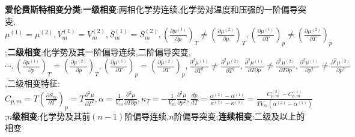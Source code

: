 \documentclass[10pt,a4paper]{article}
\begin{document}
\begin{multicols}{2}
\textbf{爱伦费斯特相变分类}:\textbf{一级相变}:两相化学势连续,化学势对温度和压强的一阶偏导突变,$\mu^{(1)}=\mu^{(2)},V_m^{(1)}=V_m^{(2)},S_m^{(1)}=S_m^{(2)},\left(\frac{\partial\mu^{(1)}}{\partial p}\right)_T\neq\left(\frac{\partial\mu^{(2)}}{\partial p}\right)_T,\left(\frac{\partial\mu^{(1)}}{\partial T}\right)_p\neq\left(\frac{\partial\mu^{(2)}}{\partial T}\right)_p$;\textbf{二级相变}:化学势及其一阶偏导连续,二阶偏导突变,$\cdots,\left(\frac{\partial\mu^{(1)}}{\partial p}\right)_T=\left(\frac{\partial\mu^{(2)}}{\partial p}\right)_T,\left(\frac{\partial\mu^{(1)}}{\partial T}\right)_p=\left(\frac{\partial\mu^{(2)}}{\partial T}\right)_p,\frac{\partial^2\mu^{(1)}}{\partial T^2}\neq\frac{\partial^2\mu^{(2)}}{\partial T^2},\frac{\partial^2\mu^{(1)}}{\partial T\partial p}\neq\frac{\partial^2\mu^{(2)}}{\partial T\partial p},\frac{\partial^2\mu^{(1)}}{\partial p^2}\neq\frac{\partial^2\mu^{(2)}}{\partial p^2}$,二级相变特征:$C_{p,m}=T\left(\frac{\partial S_m}{\partial T}\right)_p=T\frac{\partial^2\mu}{\partial T^2},\alpha=\frac{1}{V_m}\frac{\partial^2\mu}{\partial T\partial p},\kappa_T=-\frac{1}{V_m}\frac{\partial^2\mu}{\partial p^2},\frac{dp}{dT}=\frac{\alpha^{(2)}-\alpha^{(1)}}{\kappa^{(2)}-\kappa^{(1)}}=\frac{C_{p,m}^{(2)}-C_{p,m}^{(1)}}{TV_m(\alpha^{(2)}-\alpha^{(1)})}$;\textbf{$n$级相变}:化学势及其前$(n-1)$阶偏导连续,$n$阶偏导突变;\textbf{连续相变}:二级及以上的相变
\end{multicols}
\end{document}
